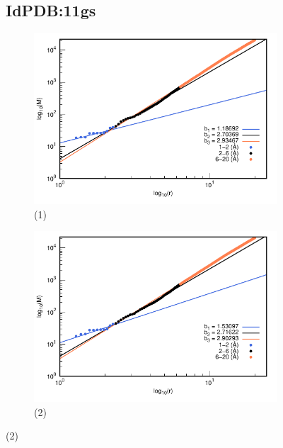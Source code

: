 \begin{figure}[H]
	\subsection*{IdPDB:11gs}
	
	\hspace{-0.3cm} 
	\begin{subfigure}{0.49\textwidth}
		\centering
		\includegraphics[width=\linewidth,page=1]{graphs/PDBs/11gs/11gsaddH.pdf}
		\caption{(1)}
	\end{subfigure}
	\hspace{0.2cm}
	\begin{subfigure}{0.49\textwidth}
		\centering
		\includegraphics[width=\linewidth,page=1]{graphs/PDBs/11gs/11gsEm.pdf}
		\caption{(2)}
	\end{subfigure}
	

\end{figure}
